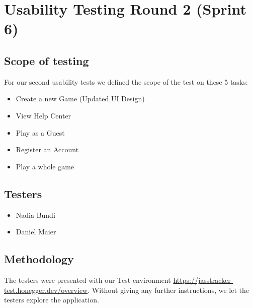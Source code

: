 \section{Usability Testing Round 2 (Sprint 6)}

\subsection{Scope of testing}
For our second usability tests we defined the scope of the test on these 5 tasks:
\begin{itemize}
    \item Create a new Game (Updated UI Design)
    \item View Help Center
    \item Play as a Guest
    \item Register an Account
    \item Play a whole game
\end{itemize}

\subsection{Testers}
\begin{itemize}
    \item Nadia Bundi
    \item Daniel Maier
\end{itemize}

\subsection{Methodology}
The testers were presented with our Test environment \url{https://jasstracker-test.honegger.dev/overview}.
Without giving any further instructions, we let the testers explore the application. 

